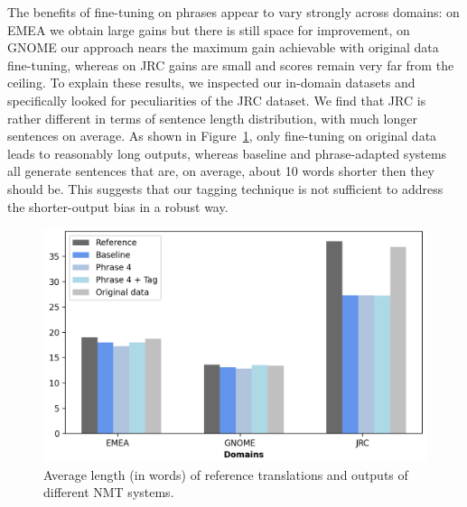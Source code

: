 The benefits of fine-tuning on phrases appear to vary strongly across domains: on EMEA we obtain large gains but there is still space for improvement, on GNOME our approach nears the maximum gain achievable with original data fine-tuning, whereas on JRC gains are small and scores remain very far from the ceiling. 
To explain these results, we inspected our in-domain datasets and specifically looked for peculiarities of the JRC dataset. We find that JRC is rather different in terms of sentence length distribution, with much longer sentences on average. As shown in Figure~\ref{fig:average_length_results}, only fine-tuning on original data leads to reasonably long outputs, whereas baseline and phrase-adapted systems all generate sentences that are, on average, about 10 words shorter then they should be. This suggests that our tagging technique is not sufficient to address the shorter-output bias in a robust way.

\begin{figure}[hb!]
    \centering
    \includegraphics[scale=0.7]{images/average_result.png}
    \caption{Average length (in words) of reference translations and outputs of different NMT systems.}
    \label{fig:average_length_results}
\end{figure}

